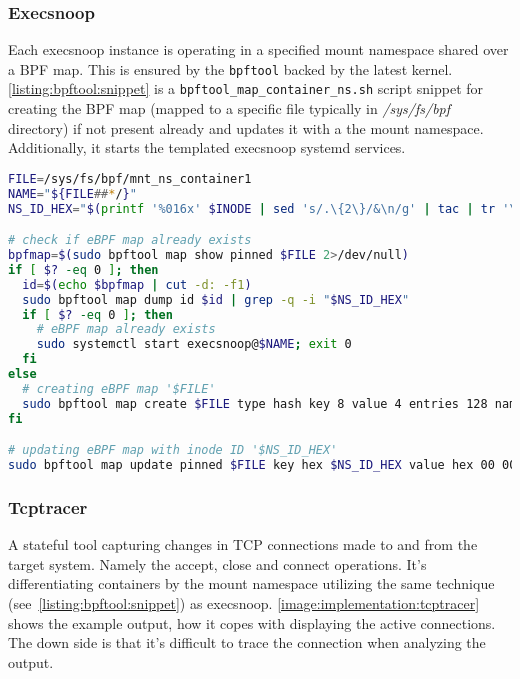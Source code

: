\subsubsection*{Execsnoop \label{implementation:mon:hunting:execsnoop}}
Each execsnoop instance is operating in a specified mount namespace shared over a BPF map. This is ensured by the \texttt{bpftool} backed by the latest kernel. \autoref{listing:bpftool:snippet} is a \texttt{bpftool\_map\_container\_ns.sh} script snippet for creating the BPF map (mapped to a specific file typically in \textit{/sys/fs/bpf} directory) if not present already and updates it with a the mount namespace. Additionally, it starts the templated execsnoop systemd services.

\begin{lstlisting}[language=bash, style=custom, caption={Setup of BPF map for sharing the mount namespave with execsnoop instance. INODE variable is retrieved using the command sequence specified in \autoref{listing:sneakpeek:mntns}}, label=listing:bpftool:snippet]
FILE=/sys/fs/bpf/mnt_ns_container1
NAME="${FILE##*/}"
NS_ID_HEX="$(printf '%016x' $INODE | sed 's/.\{2\}/&\n/g' | tac | tr '\n' ' ')"

# check if eBPF map already exists
bpfmap=$(sudo bpftool map show pinned $FILE 2>/dev/null)
if [ $? -eq 0 ]; then
  id=$(echo $bpfmap | cut -d: -f1)
  sudo bpftool map dump id $id | grep -q -i "$NS_ID_HEX"
  if [ $? -eq 0 ]; then
    # eBPF map already exists
    sudo systemctl start execsnoop@$NAME; exit 0
  fi
else
  # creating eBPF map '$FILE'
  sudo bpftool map create $FILE type hash key 8 value 4 entries 128 name $NAME flags 0
fi

# updating eBPF map with inode ID '$NS_ID_HEX'
sudo bpftool map update pinned $FILE key hex $NS_ID_HEX value hex 00 00 00 00 any
\end{lstlisting}

\subsubsection*{Tcptracer \label{implementation:mon:hunting:tcptracer}}
A stateful tool capturing changes in TCP connections made to and from the target system. Namely the accept, close and connect operations. It's differentiating containers by the mount namespace utilizing the same technique (see~\autoref{listing:bpftool:snippet}) as execsnoop. \autoref{image:implementation:tcptracer} shows the example output, how it copes with displaying the active connections. The down side is that it's difficult to trace the connection when analyzing the output.

